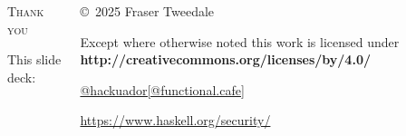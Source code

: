 \documentclass[ignorenonframetext,aspectratio=169,12pt]{beamer}
\begin{document}
\begin{frame}[plain]
\begin{columns}

  \begin{column}{.4\textwidth}
    \begin{center}
    {
        {\Large \textsc{Thank you}}

        \bigskip

        This slide deck:\\
    }
    \end{center}
  \end{column}

  \begin{column}{.6\textwidth}

    \setlength{\parskip}{.5em}

    { \centering

    

    \copyright~2025  Fraser Tweedale

    { \scriptsize
    Except where otherwise noted this work is licensed under
    }
    { \footnotesize
    \textbf{http://creativecommons.org/licenses/by/4.0/}
    }

    }

    \begin{description}
      \small
      \item[Socials]
        \href{https://functional.cafe/@hackuador}{@hackuador[@functional.cafe]}
      \item[Haskell SRT] \url{https://www.haskell.org/security/}
    \end{description}
  \end{column}

\end{columns}
\end{frame}
\end{document}

